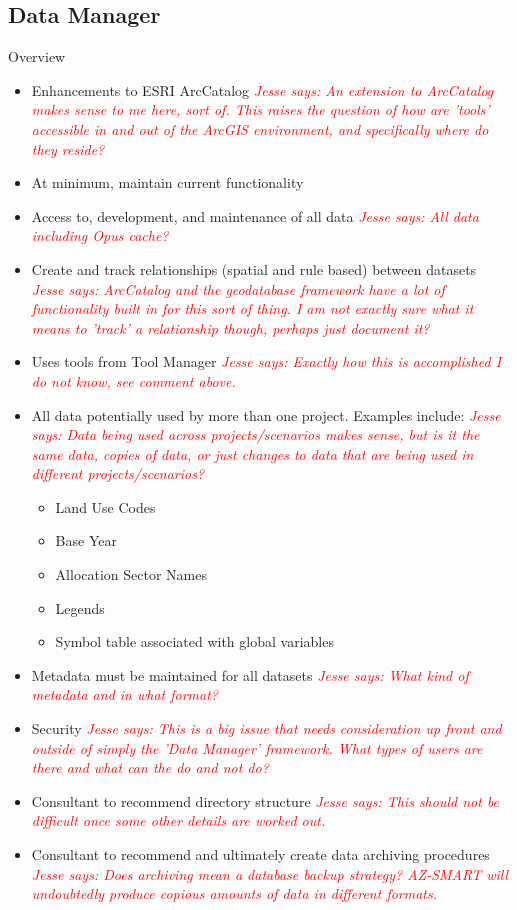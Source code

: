 \documentclass[titlepage]{article}
\begin{document}
\subsection{Data Manager}
Overview
\begin{itemize}
	\item Enhancements to ESRI ArcCatalog
		\textcolor{red}{\textit{Jesse says: An extension to ArcCatalog makes sense to me here, sort of.  This raises the question of how are 'tools' accessible in and out of the ArcGIS environment, and specifically where do they reside?}}
	\item At minimum, maintain current functionality
	\item Access to, development, and maintenance of all data
		\textcolor{red}{\textit{Jesse says: All data including Opus cache?}}
	\item Create and track relationships (spatial and rule based) between datasets
		\textcolor{red}{\textit{Jesse says: ArcCatalog and the geodatabase framework have a lot of functionality built in for this sort of thing.  I am not exactly sure what it means to 'track' a relationship though, perhaps just document it?}}
	\item Uses tools from Tool Manager
		\textcolor{red}{\textit{Jesse says: Exactly how this is accomplished I do not know, see comment above.}}
	\item All data potentially used by more than one project. Examples include:
		\textcolor{red}{\textit{Jesse says: Data being used across projects/scenarios makes sense, but is it the same data, copies of data, or just changes to data that are being used in different projects/scenarios?}}
		\begin{itemize}
			\item Land Use Codes
			\item Base Year
			\item Allocation Sector Names
			\item Legends
			\item Symbol table associated with global variables
		\end{itemize}
	\item Metadata must be maintained for all datasets
		\textcolor{red}{\textit{Jesse says: What kind of metadata and in what format?}}
	\item Security
		\textcolor{red}{\textit{Jesse says: This is a big issue that needs consideration up front and outside of simply the 'Data Manager' framework.  What types of users are there and what can the do and not do?}}
	\item Consultant to recommend directory structure
		\textcolor{red}{\textit{Jesse says: This should not be difficult once some other details are worked out.}}
	\item Consultant to recommend and ultimately create data archiving procedures
		\textcolor{red}{\textit{Jesse says: Does archiving mean a database backup strategy?  AZ-SMART will undoubtedly produce copious amounts of data in different formats.}}
\end{itemize}
\end{document}
